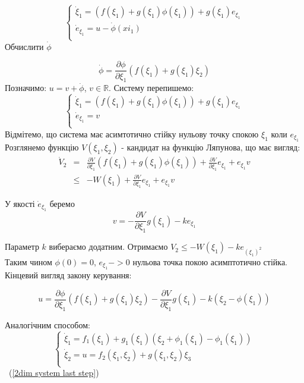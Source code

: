 \documentclass{article}
\begin{document}
\begin{equation}
    \begin{cases}
    \dot \xi_1 = (f(\xi_1)+g(\xi_1)\phi(\xi_1))+g(\xi_1)e_{\xi_1}\\
    \dot e_{\xi_1} = u-\dot \phi(xi_1)\\  
    \end{cases}
\end{equation}
Обчислити $\dot\phi$ 

\begin{equation}
    \dot\phi = \frac{\partial \phi}{\partial \xi_1}(f(\xi_1)+g(\xi_1)\xi_2)
\end{equation}
Позначимо: $u = v + \dot\phi$, $v \in \mathbb{R}$.
Систему перепишемо:
\begin{equation}
    \begin{cases}
        \dot \xi_1 = (f(\xi_1)+g(\xi_1)\phi(\xi_1))+g(\xi_1)e_{\xi_1}\\
        \dot e_{\xi_1} = v\\
    \end{cases}
\end{equation}
Відмітемо, що система має асимтотично стійку нульову точку спокою $\xi_1$ коли $e_{\xi_1}$
Розглянемо функцію $V(\xi_1,\xi_2)$ - кандидат на функцію Ляпунова, що має вигляд:
\begin{eqnarray}
    \dot V_2 &=& \frac{\partial V}{\partial \xi_1}(f(\xi_1)+g(\xi_1)\phi(\xi_1))+
    \frac{\partial V}{\partial \xi_1}e_{\xi_1}+e_{\xi_1}v\\
    &\leq& -W(\xi_1)+ \frac{\partial V}{\partial \xi_1}e_{\xi_1}+e_{\xi_1}v
\end{eqnarray}

У якості $\dot e_{\xi_1}$ беремо 
\begin{equation}
    v = - \frac{\partial V}{\partial \xi_1}g(\xi_1) - ke_{\xi_1}
\end{equation}

Параметр $k$ вибераємо додатним.
Отримаємо $V_2 \leq -W(\xi_1) - ke_{(\xi_1)^2}$ \\
Таким чином $\phi(0)=0$, $e_{\xi_1} -> 0$ нульова точка покою асимптотично стійка.
Кінцевий вигляд закону керування:

\begin{equation}
    u = \frac{\partial \phi}{\partial \xi_1}(f(\xi_1)+g(\xi_1)\xi_2)-
    \frac{\partial V}{\partial \xi_1}g(\xi_1)-k(\xi_2-\phi(\xi_1))
\end{equation}

Аналогічним способом:
\begin{equation} \label{2dim system last step}
    \begin{cases}
        \dot \xi_1 = f_1(\xi_1)+g_1(\xi_1)(\xi_2 + \phi_1(\xi_1)-\phi_1(\xi_1))\\
        \dot \xi_2 = u = f_2(\xi_1,\xi_2)+g(\xi_1,\xi_2)\xi_3\\
    \end{cases}
\end{equation}
~(\ref{2dim system last step})
\end{document}

